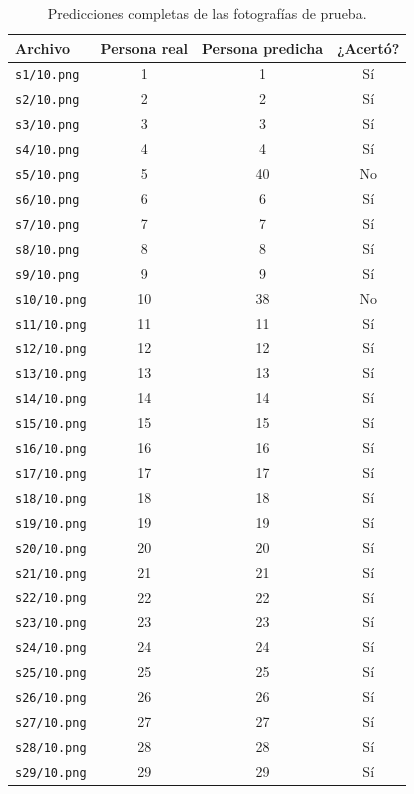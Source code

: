 \documentclass[11pt,a4paper]{article}
\newcommand{\archivo}[1]{\texttt{#1}}
\begin{document}
\begin{table}[h]
\centering
\caption{Predicciones completas de las fotografías de prueba.}
\label{tab:predicciones}
\small
\setlength{\tabcolsep}{12pt}
\renewcommand{\arraystretch}{1.02}
\begin{tabular}{lccc}
\toprule
Archivo & Persona real & Persona predicha & ¿Acertó?\\
\midrule
\archivo{s1/10.png} & 1 & 1 & Sí\\
\archivo{s2/10.png} & 2 & 2 & Sí\\
\archivo{s3/10.png} & 3 & 3 & Sí\\
\archivo{s4/10.png} & 4 & 4 & Sí\\
\archivo{s5/10.png} & 5 & 40 & No\\
\archivo{s6/10.png} & 6 & 6 & Sí\\
\archivo{s7/10.png} & 7 & 7 & Sí\\
\archivo{s8/10.png} & 8 & 8 & Sí\\
\archivo{s9/10.png} & 9 & 9 & Sí\\
\archivo{s10/10.png} & 10 & 38 & No\\
\archivo{s11/10.png} & 11 & 11 & Sí\\
\archivo{s12/10.png} & 12 & 12 & Sí\\
\archivo{s13/10.png} & 13 & 13 & Sí\\
\archivo{s14/10.png} & 14 & 14 & Sí\\
\archivo{s15/10.png} & 15 & 15 & Sí\\
\archivo{s16/10.png} & 16 & 16 & Sí\\
\archivo{s17/10.png} & 17 & 17 & Sí\\
\archivo{s18/10.png} & 18 & 18 & Sí\\
\archivo{s19/10.png} & 19 & 19 & Sí\\
\archivo{s20/10.png} & 20 & 20 & Sí\\
\archivo{s21/10.png} & 21 & 21 & Sí\\
\archivo{s22/10.png} & 22 & 22 & Sí\\
\archivo{s23/10.png} & 23 & 23 & Sí\\
\archivo{s24/10.png} & 24 & 24 & Sí\\
\archivo{s25/10.png} & 25 & 25 & Sí\\
\archivo{s26/10.png} & 26 & 26 & Sí\\
\archivo{s27/10.png} & 27 & 27 & Sí\\
\archivo{s28/10.png} & 28 & 28 & Sí\\
\archivo{s29/10.png} & 29 & 29 & Sí\\

\end{tabular}
\end{table}
\end{document}
